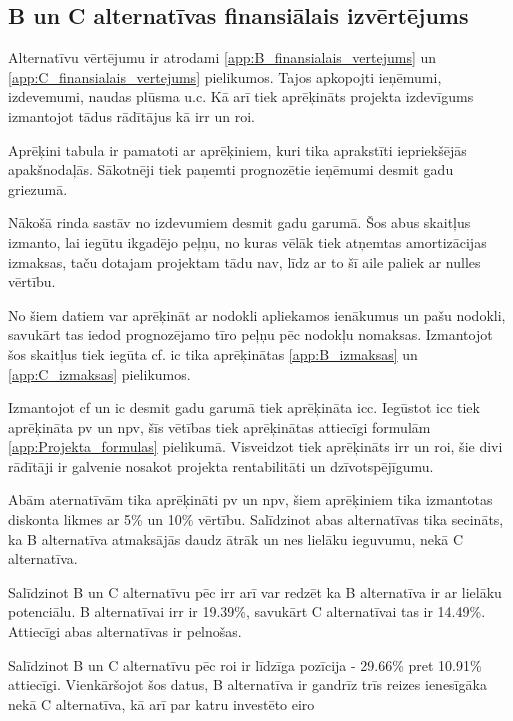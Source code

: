 \subsection{B un C alternatīvas finansiālais izvērtējums}
\par
Alternatīvu vērtējumu ir atrodami \ref{app:B_finansialais_vertejums} un \ref{app:C_finansialais_vertejums} pielikumos.
Tajos apkopojti ieņēmumi, izdevemumi, naudas plūsma u.c. Kā arī tiek aprēķināts projekta izdevīgums izmantojot
tādus rādītājus kā \gls{irr} un \gls{roi}.
\par
Aprēķini tabula ir pamatoti ar aprēķiniem, kuri tika aprakstīti iepriekšējās apakšnodaļās. Sākotnēji
tiek paņemti prognozētie ieņēmumi desmit gadu griezumā.
\par 
Nākošā rinda sastāv no izdevumiem desmit gadu garumā. Šos abus skaitļus izmanto, lai iegūtu ikgadējo 
peļņu, no kuras vēlāk tiek atņemtas amortizācijas izmaksas, taču dotajam projektam tādu nav, līdz 
ar to šī aile paliek ar nulles vērtību.
\par 
No šiem datiem var aprēķināt ar nodokli apliekamos ienākumus un pašu nodokli, savukārt tas iedod
prognozējamo tīro peļņu pēc nodokļu nomaksas. Izmantojot šos skaitļus tiek iegūta \gls{cf}. \Gls{ic} tika aprēķinātas 
\ref{app:B_izmaksas} un \ref{app:C_izmaksas} pielikumos. 
\par
Izmantojot \acrshort{cf} un \acrshort{ic} desmit gadu garumā tiek aprēķināta \gls{icc}. Iegūstot \acrshort{icc} 
tiek aprēķināta \gls{pv} un \gls{npv}, šīs vētības tiek aprēķinātas attiecīgi formulām \ref{app:Projekta_formulas}
pielikumā. Visveidzot tiek aprēķināts \acrshort{irr} un \acrshort{roi}, šie divi rādītāji ir galvenie nosakot 
projekta rentabilitāti un dzīvotspējīgumu.
\par
Abām aternatīvām tika aprēķināti \acrshort{pv} un \acrshort{npv}, šiem aprēķiniem tika izmantotas diskonta
likmes ar 5\% un 10\% vērtību. Salīdzinot abas alternatīvas tika secināts, ka B alternatīva atmaksājās daudz
ātrāk un nes lielāku ieguvumu, nekā C alternatīva. 
\par
Salīdzinot B un C alternatīvu pēc \gls{irr} arī var redzēt ka B alternatīva ir ar lielāku potenciālu.
B alternatīvai \gls{irr} ir 19.39\%, savukārt C alternatīvai tas ir 14.49\%. Attiecīgi abas alternatīvas ir
pelnošas.
\par
Salīdzinot B un C alternatīvu pēc \gls{roi} ir līdzīga pozīcija - 29.66\% pret 10.91\% attiecīgi. Vienkāršojot
šos datus, B alternatīva ir gandrīz trīs reizes ienesīgāka nekā C alternatīva, kā arī par katru investēto eiro
